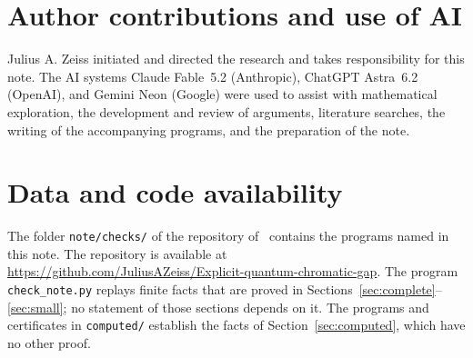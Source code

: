 \documentclass[a4paper,11pt]{article}
\theoremstyle{definition}
\numberwithin{equation}{section}
\begin{document}
\section*{Author contributions and use of AI}
Julius A. Zeiss initiated and directed the research and takes responsibility for this note. The AI systems Claude Fable~5.2 (Anthropic), ChatGPT Astra~6.2 (OpenAI), and Gemini Neon (Google) were used to assist with mathematical exploration, the development and review of arguments, literature searches, the writing of the accompanying programs, and the preparation of the note.

\section*{Data and code availability}
The folder \texttt{note/checks/} of the repository of~\cite{Z} contains the programs named in this note. The repository is available at \url{https://github.com/JuliusAZeiss/Explicit-quantum-chromatic-gap}. The program \texttt{check\_note.py} replays finite facts that are proved in Sections~\ref{sec:complete}--\ref{sec:small}; no statement of those sections depends on it. The programs and certificates in \texttt{computed/} establish the facts of Section~\ref{sec:computed}, which have no other proof.

\begingroup\small


\endgroup
\end{document}
